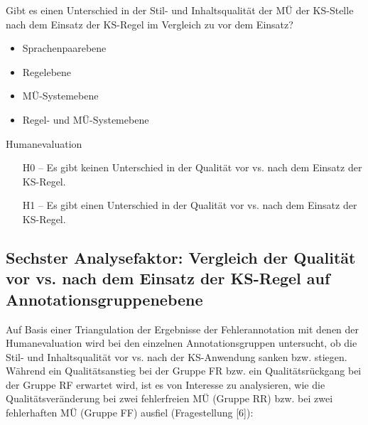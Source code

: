 \begin{description}[font=\normalfont\bfseries]
\item [Fragestellung] Gibt es einen Unterschied in der Stil- und Inhaltsqualität der MÜ der KS-Stelle nach dem Einsatz der KS-Regel im Vergleich zu vor dem Einsatz?
\item [Analyseebene]\hfill
  \begin{itemize}
  \item Sprachenpaarebene
  \item Regelebene
  \item MÜ-Systemebene
  \item Regel- und MÜ-Systemebene
  \end{itemize}
\item [Analysemethode] Humanevaluation
\item [Hypothesen]\hfill
  \begin{itemize}
  \item [H0] -- Es gibt keinen Unterschied in der Qualität vor vs. nach dem Einsatz der KS-Regel.
  \item [H1] -- Es gibt einen Unterschied in der Qualität vor vs. nach dem Einsatz der KS-Regel.
  \end{itemize}
\end{description}


\subsection*{Sechster Analysefaktor: Vergleich der Qualität vor vs. nach dem Einsatz der KS-Regel auf Annotationsgruppenebene}

Auf Basis einer Triangulation der Ergebnisse der Fehlerannotation mit denen der Humanevaluation wird bei den einzelnen Annotationsgruppen untersucht, ob die Stil- und Inhaltsqualität vor vs. nach der KS-Anwendung sanken bzw. stiegen. Während ein Qualitätsanstieg bei der Gruppe FR bzw. ein Qualitätsrückgang bei der Gruppe RF erwartet wird, ist es von Interesse zu analysieren, wie die Qualitätsveränderung bei zwei fehlerfreien MÜ (Gruppe RR) bzw. bei zwei fehlerhaften MÜ (Gruppe FF) ausfiel (Fragestellung [6]):

